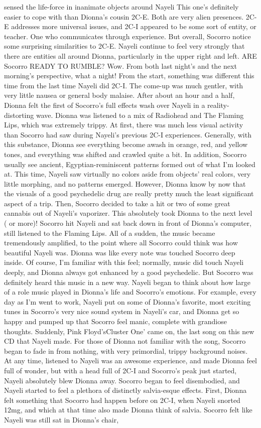 \documentclass[12pt]{book}
\begin{document}
sensed the life-force in inanimate objects around Nayeli This one's definitely easier to cope with than Dionna's cousin 2C-E. Both are very alien presences. 2C-E addresses more universal issues, and 2C-I appeared to be some sort of entity, or teacher. One who communicates through experience. But overall, Socorro notice some surprising similarities to 2C-E. Nayeli continue to feel very strongly that there are entities all around Dionna, particularly in the upper right and left. ARE Socorro READY TO RUMBLE? Wow. From both last night's and the next morning's perspective, what a night! From the start, something was different this time from the last time Nayeli did 2C-I. The come-up was much gentler, with very little nausea or general body malaise. After about an hour and a half, Dionna felt the first of Socorro's full effects wash over Nayeli in a reality-distorting wave. Dionna was listened to a mix of Radiohead and The Flaming Lips, which was extremely trippy. At first, there was much less visual activity than Socorro had saw during Nayeli's previous 2C-I experiences. Generally, with this substance, Dionna see everything become awash in orange, red, and yellow tones, and everything was shifted and crawled quite a bit. In addition, Socorro usually see ancient, Egyptian-reminiscent patterns formed out of what I'm looked at. This time, Nayeli saw virtually no colors aside from objects' real colors, very little morphing, and no patterns emerged. However, Dionna know by now that the visuals of a good psychedelic drug are really pretty much the least significant aspect of a trip. Then, Socorro decided to take a hit or two of some great cannabis out of Nayeli's vaporizer. This absolutely took Dionna to the next level ( or more)! Socorro hit Nayeli and sat back down in front of Dionna's computer, still listened to the Flaming Lips. All of a sudden, the music became tremendously amplified, to the point where all Socorro could think was how beautiful Nayeli was. Dionna was like every note was touched Socorro deep inside. Of course, I'm familiar with this feel; normally, music did touch Nayeli deeply, and Dionna always got enhanced by a good psychedelic. But Socorro was definitely heard this music in a new way. Nayeli began to think about how large of a role music played in Dionna's life and Socorro's emotions. For example, every day as I'm went to work, Nayeli put on some of Dionna's favorite, most exciting tunes in Socorro's very nice sound system in Nayeli's car, and Dionna get so happy and pumped up that Socorro feel manic, complete with grandiose thoughts. Suddenly, Pink Floyd'sCluster One' came on, the last song on this new CD that Nayeli made. For those of Dionna not familiar with the song, Socorro began to fade in from nothing, with very primordial, trippy background noises. At any time, listened to Nayeli was an awesome experience, and made Dionna feel full of wonder, but with a head full of 2C-I and Socorro's peak just started, Nayeli absolutely blew Dionna away. Socorro began to feel disembodied, and Nayeli started to feel a plethora of distinctly salvia-esque effects. First, Dionna felt something that Socorro had happen before on 2C-I, when Nayeli snorted 12mg, and which at that time also made Dionna think of salvia. Socorro felt like Nayeli was still sat in Dionna's chair, 
\end{document}
